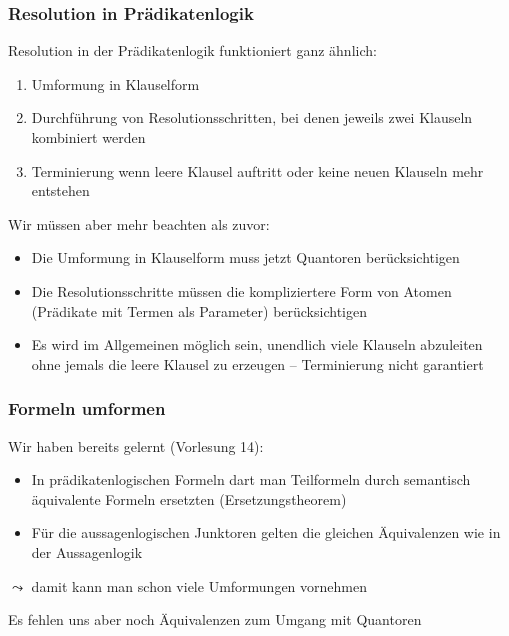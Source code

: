 \documentclass[onlymath]{beamer}
\begin{document}
\begin{frame}\frametitle{Resolution in Prädikatenlogik}

Resolution in der Prädikatenlogik funktioniert ganz ähnlich:
\begin{enumerate}[(1)]
\item Umformung in Klauselform
\item Durchführung von Resolutionsschritten, bei denen jeweils zwei Klauseln kombiniert werden
\item Terminierung wenn leere Klausel auftritt oder keine neuen Klauseln mehr entstehen
\end{enumerate}
\bigskip

Wir müssen aber mehr beachten als zuvor:
\begin{itemize}
\item Die Umformung in Klauselform muss jetzt \alert{Quantoren} berücksichtigen
\item Die Resolutionsschritte müssen die \alert{kompliziertere Form von Atomen} (Prädikate mit Termen als Parameter) berücksichtigen
\item Es wird im Allgemeinen möglich sein, unendlich viele Klauseln abzuleiten ohne jemals die leere Klausel zu erzeugen -- \alert{Terminierung nicht garantiert}
\end{itemize}

\end{frame}


\begin{frame}\frametitle{Formeln umformen}

Wir haben bereits gelernt (Vorlesung 14):
\begin{itemize}
\item In prädikatenlogischen Formeln dart man Teilformeln durch semantisch äquivalente
Formeln ersetzten (Ersetzungstheorem)
\item Für die aussagenlogischen Junktoren gelten die gleichen Äquivalenzen wie in der Aussagenlogik
\end{itemize}
$\leadsto$ damit kann man schon viele Umformungen vornehmen
\bigskip

Es fehlen uns aber noch Äquivalenzen zum Umgang mit Quantoren

\end{frame}
\end{document}
